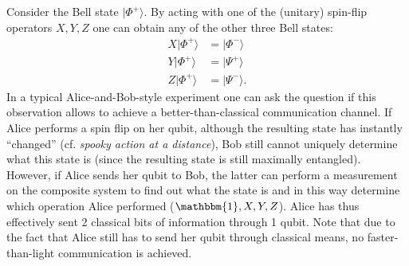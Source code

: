 
    \begin{method}
        Consider the Bell state $|\Phi^+\rangle$. By acting with one of the (unitary) spin-flip operators $X,Y,Z$ one can obtain any of the other three Bell states:
        \begin{align}
            X|\Phi^+\rangle &= |\Phi^-\rangle\nonumber\\
            Y|\Phi^+\rangle &= |\Psi^+\rangle\\
            Z|\Phi^+\rangle &= |\Psi^-\rangle.\nonumber
        \end{align}
        In a typical Alice-and-Bob-style experiment one can ask the question if this observation allows to achieve a better-than-classical communication channel. If Alice performs a spin flip on her qubit, although the resulting state has instantly ``changed'' (cf. \textit{spooky action at a distance}), Bob still cannot uniquely determine what this state is (since the resulting state is still maximally entangled). However, if Alice sends her qubit to Bob, the latter can perform a measurement on the composite system to find out what the state is and in this way determine which operation Alice performed ($\mathbbm{1},X,Y,Z$). Alice has thus effectively sent 2 classical bits of information through 1 qubit. Note that due to the fact that Alice still has to send her qubit through classical means, no faster-than-light communication is achieved.
    \end{method}

